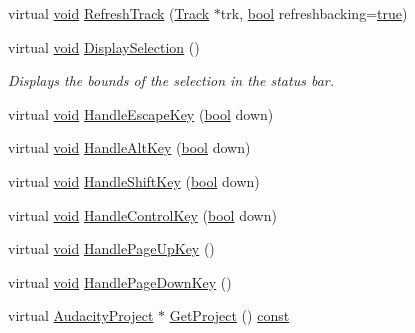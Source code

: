 \begin{DoxyCompactItemize}
virtual \hyperlink{sound_8c_ae35f5844602719cf66324f4de2a658b3}{void} \hyperlink{class_track_panel_ad8029c7399be65255dc67a638e6372f3}{Refresh\+Track} (\hyperlink{class_track}{Track} $\ast$trk, \hyperlink{mac_2config_2i386_2lib-src_2libsoxr_2soxr-config_8h_abb452686968e48b67397da5f97445f5b}{bool} refreshbacking=\hyperlink{mac_2config_2i386_2lib-src_2libsoxr_2soxr-config_8h_a41f9c5fb8b08eb5dc3edce4dcb37fee7}{true})
\item 
virtual \hyperlink{sound_8c_ae35f5844602719cf66324f4de2a658b3}{void} \hyperlink{class_track_panel_a1a3b533d6302e7ad5da8b9bc82a0dd74}{Display\+Selection} ()
\begin{DoxyCompactList}\small\item\em Displays the bounds of the selection in the status bar. \end{DoxyCompactList}\item 
virtual \hyperlink{sound_8c_ae35f5844602719cf66324f4de2a658b3}{void} \hyperlink{class_track_panel_a56ac00621d5ee5be4cd3a585dde8e468}{Handle\+Escape\+Key} (\hyperlink{mac_2config_2i386_2lib-src_2libsoxr_2soxr-config_8h_abb452686968e48b67397da5f97445f5b}{bool} down)
\item 
virtual \hyperlink{sound_8c_ae35f5844602719cf66324f4de2a658b3}{void} \hyperlink{class_track_panel_a4bb51bc8c4fab9e485916ebb2a8e30b3}{Handle\+Alt\+Key} (\hyperlink{mac_2config_2i386_2lib-src_2libsoxr_2soxr-config_8h_abb452686968e48b67397da5f97445f5b}{bool} down)
\item 
virtual \hyperlink{sound_8c_ae35f5844602719cf66324f4de2a658b3}{void} \hyperlink{class_track_panel_a87d0b14734af33fd1f9c900b36c16a18}{Handle\+Shift\+Key} (\hyperlink{mac_2config_2i386_2lib-src_2libsoxr_2soxr-config_8h_abb452686968e48b67397da5f97445f5b}{bool} down)
\item 
virtual \hyperlink{sound_8c_ae35f5844602719cf66324f4de2a658b3}{void} \hyperlink{class_track_panel_aad125fe23ac8546f37eaab04696b227e}{Handle\+Control\+Key} (\hyperlink{mac_2config_2i386_2lib-src_2libsoxr_2soxr-config_8h_abb452686968e48b67397da5f97445f5b}{bool} down)
\item 
virtual \hyperlink{sound_8c_ae35f5844602719cf66324f4de2a658b3}{void} \hyperlink{class_track_panel_a0bc11f32c1bf93bed8afcd25803b666f}{Handle\+Page\+Up\+Key} ()
\item 
virtual \hyperlink{sound_8c_ae35f5844602719cf66324f4de2a658b3}{void} \hyperlink{class_track_panel_a706dd6b1e9328bad9925cb6b4dea57fb}{Handle\+Page\+Down\+Key} ()
\item 
virtual \hyperlink{class_audacity_project}{Audacity\+Project} $\ast$ \hyperlink{class_track_panel_a21ed95e85483b9a266aba93a412fc860}{Get\+Project} () \hyperlink{getopt1_8c_a2c212835823e3c54a8ab6d95c652660e}{const} 

\end{DoxyCompactItemize}
